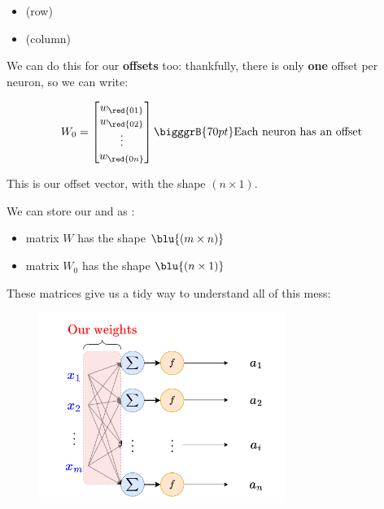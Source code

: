         \begin{itemize}
            \item {} (row)
            \item {} (column)
        \end{itemize} 
        
        We can do this for our \textbf{offsets} too: thankfully, there is only \textbf{one} offset per neuron, so we can write:
        
        \begin{equation}
            W_0 = 
                \begin{bmatrix}
                  w_{\red{01}} \\ w_{\red{02}} \\ \vdots \\ w_{\red{0n}}
                \end{bmatrix}
            \bigggrB{70pt} \text{Each neuron has an offset}
        \end{equation}
        
        This is our offset vector, with the shape $(n \times 1)$.\\
        
        \begin{notation}
            We can store our  and  as :
            
            \begin{itemize}
                \item {} matrix $W$ has the shape $\blu{(m \times n)}$
                
                \item {} matrix $W_0$ has the shape $\blu{(n \times 1)}$
            \end{itemize}
        \end{notation}
        
        These matrices give us a tidy way to understand all of this mess:
        
        \begin{figure}[H]
            \centering
            \includegraphics[width=80mm,scale=0.4]{images/nn_images/weights_highlighted.png}
        \end{figure}
        
